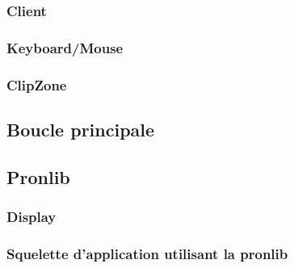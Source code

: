 \subsubsection{Client}

\subsubsection{Keyboard/Mouse}

\subsubsection{ClipZone}

\subsection{Boucle principale}

\subsection{Pronlib}

\subsubsection{Display}

\subsubsection{Squelette d'application utilisant la pronlib}
